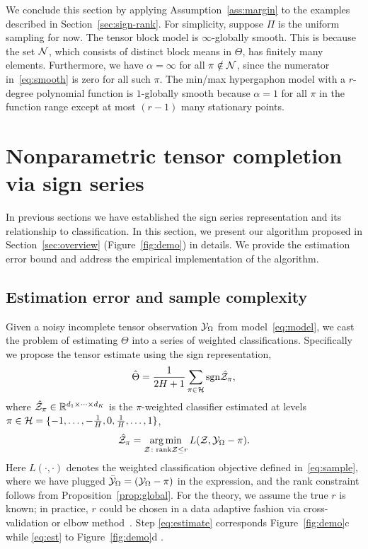 \documentclass[11pt]{article}
\theoremstyle{plain}
\theoremstyle{definition}
\def\sign{\textup{sgn}}
\begin{document}
We conclude this section by applying Assumption~\ref{ass:margin} to the examples described in Section~\ref{sec:sign-rank}. For simplicity, suppose $\Pi$ is the uniform sampling for now. The tensor block model is $\infty$-globally smooth. This is because the set $\mathcal{N}$, which consists of distinct block means in $\Theta$, has finitely many elements. Furthermore, we have $\alpha= \infty$ for all $\pi \notin \mathcal{N}$, since the numerator in~\eqref{eq:smooth} is zero for all such $\pi$. The min/max hypergaphon model with a $r$-degree polynomial function is $1$-globally smooth because $\alpha=1$ for all $\pi$ in the function range except at most $(r-1)$ many stationary points.



\section{Nonparametric tensor completion via sign series}\label{sec:estimation}
In previous sections we have established the sign series representation and its relationship to classification. In this section, we present our algorithm proposed in Section~\ref{sec:overview} (Figure~\ref{fig:demo}) in details. We provide the estimation error bound and address the empirical implementation of the algorithm. 

\subsection{Estimation error and sample complexity}

Given a noisy incomplete tensor observation $\mathcal{Y}_\Omega$ from model~\eqref{eq:model}, we cast the problem of estimating $\Theta$ into a series of weighted classifications. Specifically we propose the tensor estimate using the sign representation,
\begin{equation}\label{eq:est}
\hat \Theta = {1\over 2H+1}\sum_{\pi \in \tH}\sign{\hat \tZ_\pi},
\end{equation}
where $\hat {\mathcal{Z}}_\pi\in\mathbb{R}^{d_1\times \dots\times d_K}$ is the $\pi$-weighted classifier estimated at levels $\pi \in \mathcal{H}=\{-1,\ldots,-{1\over H}, 0, {1\over H},\ldots,1\}$,
\begin{equation}\label{eq:estimate}
\hat {\mathcal{Z}}_\pi = \operatorname*{arg\,min}_{\mathcal{Z}\colon \text{rank}\mathcal{Z}\leq r} L(\mathcal{Z}, \mathcal{Y}_\Omega-\pi).
\end{equation}
Here $L(\cdot,\cdot)$ denotes the weighted classification objective defined in~\eqref{eq:sample}, where we have plugged $\bar {\mathcal{Y}}_\Omega=(\mathcal{Y}_\Omega-\pi)$ in the expression, and the rank constraint follows from Proposition~\ref{prop:global}. For the theory, we assume the true $r$ is known; in practice, $r$ could be chosen in a data adaptive fashion via cross-validation or elbow method~\citep{hastie2009elements}. Step  \eqref{eq:estimate} corresponds Figure~\ref{fig:demo}c while  \eqref{eq:est} to Figure~\ref{fig:demo}d .
\end{document}
